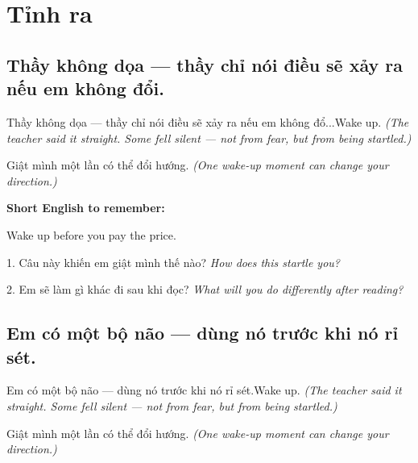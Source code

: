 \chapter{Tỉnh ra}


\section{Thầy không dọa — thầy chỉ nói điều sẽ xảy ra nếu em không đổi.}
\begin{truyen}{Thầy không dọa — thầy chỉ nói điều sẽ xảy ra nếu em không đổ...}{Wake up.}
\textit{(The teacher said it straight. Some fell silent — not from fear, but from being startled.)}
\end{truyen}

\begin{baihoc}
Giật mình một lần có thể đổi hướng.
\textit{(One wake-up moment can change your direction.)}
\end{baihoc}

\begin{ghinhoanh}
\textbf{Short English to remember:}

Wake up before you pay the price.

\end{ghinhoanh}

\begin{tuhocnhanh}
1. Câu này khiến em giật mình thế nào? \textit{How does this startle you?}

2. Em sẽ làm gì khác đi sau khi đọc? \textit{What will you do differently after reading?}
\end{tuhocnhanh}
\ngancach


\section{Em có một bộ não — dùng nó trước khi nó rỉ sét.}
\begin{truyen}{Em có một bộ não — dùng nó trước khi nó rỉ sét.}{Wake up.}
\textit{(The teacher said it straight. Some fell silent — not from fear, but from being startled.)}
\end{truyen}

\begin{baihoc}
Giật mình một lần có thể đổi hướng.
\textit{(One wake-up moment can change your direction.)}
\end{baihoc}


